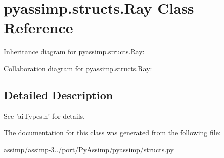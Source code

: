 \hypertarget{classpyassimp_1_1structs_1_1_ray}{\section{pyassimp.\+structs.\+Ray Class Reference}
\label{classpyassimp_1_1structs_1_1_ray}
}


Inheritance diagram for pyassimp.\+structs.\+Ray\+:


Collaboration diagram for pyassimp.\+structs.\+Ray\+:


\subsection{Detailed Description}
\begin{DoxyVerb}See 'aiTypes.h' for details.
\end{DoxyVerb}
 

The documentation for this class was generated from the following file\+:\begin{DoxyCompactItemize}
\item 
assimp/assimp-\/3../port/\+Py\+Assimp/pyassimp/structs.\+py\end{DoxyCompactItemize}
